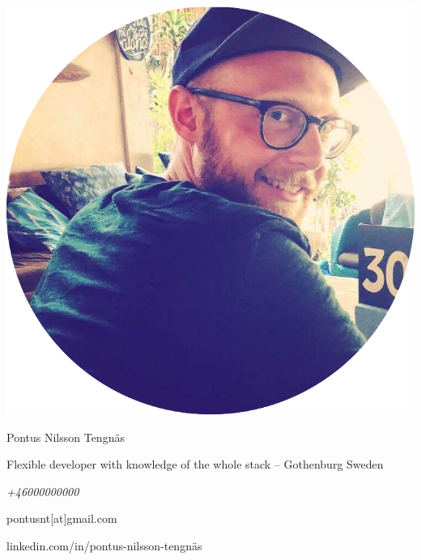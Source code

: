 \begin{minipage}{0.4\textwidth}
  \includegraphics[width=\linewidth]{../img/me.png}
\end{minipage}
\hspace{1.0cm}\begin{minipage}{0.5\textwidth}
  {\Large Pontus Nilsson Tengnäs}

  Flexible developer with knowledge of the whole stack – Gothenburg Sweden
  \newline
  \newline
  {\itshape
  +46000000000

  pontusnt[at]gmail.com

  linkedin.com/in/pontus-nilsson-tengnäs}
 
\end{minipage}